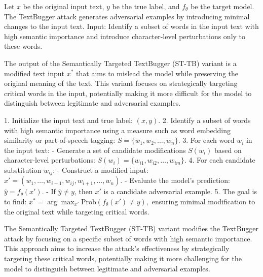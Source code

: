 Let $x$ be the original input text, $y$ be the true label, and $f_{\theta}$ be the target model. The TextBugger attack generates adversarial examples by introducing minimal changes to the input text.
Input: Identify a subset of words in the input text with high semantic importance and introduce character-level perturbations only to these words.

The output of the Semantically Targeted TextBugger (ST-TB) variant is a modified text input $x^*$ that aims to mislead the model while preserving the original meaning of the text. This variant focuses on strategically targeting critical words in the input, potentially making it more difficult for the model to distinguish between legitimate and adversarial examples.

1. Initialize the input text and true label:
   $
   (x, y).
   $
2. Identify a subset of words with high semantic importance using a measure such as word embedding similarity or part-of-speech tagging:
   $
   S = \{w_1, w_2, \ldots, w_n\}.
   $
3. For each word $w_i$ in the input text:
   - Generate a set of candidate modifications $S(w_i)$ based on character-level perturbations:
   $
   S(w_i) = \{w_{i1}, w_{i2}, \ldots, w_{im}\}.
   $
4. For each candidate substitution $w_{ij}$:
   - Construct a modified input:
   $
   x' = (w_1, \ldots, w_{i-1}, w_{ij}, w_{i+1}, \ldots, w_n).
   $
   - Evaluate the model's prediction:
   $
   \hat{y} = f_{\theta}(x').
   $
   - If $\hat{y} \neq y$, then $x'$ is a candidate adversarial example.
5. The goal is to find:
   $
   x^* = \arg\max_{x'} \text{Prob}(f_{\theta}(x') \neq y),
   $
   ensuring minimal modification to the original text while targeting critical words.

The Semantically Targeted TextBugger (ST-TB) variant modifies the TextBugger attack by focusing on a specific subset of words with high semantic importance. This approach aims to increase the attack's effectiveness by strategically targeting these critical words, potentially making it more challenging for the model to distinguish between legitimate and adversarial examples.
